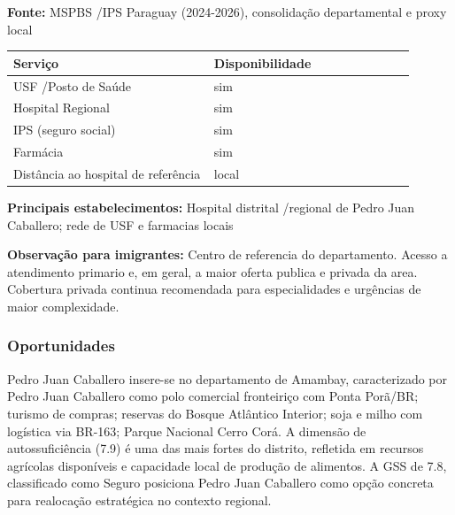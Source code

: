 \textbf{Fonte:} MSPBS /\allowbreak  IPS Paraguay (2024-2026), consolidação
departamental e proxy local

{\def\LTcaptype{none} %
\begin{longtable}{@{}>{\raggedright\arraybackslash}p{0.45\linewidth} >{\raggedright\arraybackslash}p{0.45\linewidth}@{}}
\toprule\noalign{}
Serviço & Disponibilidade \\
\midrule\noalign{}
\endhead
\bottomrule\noalign{}
\endlastfoot
USF /\allowbreak  Posto de Saúde & sim \\
Hospital Regional & sim \\
IPS (seguro social) & sim \\
Farmácia & sim \\
Distância ao hospital de referência & local \\
\end{longtable}
}

\textbf{Principais estabelecimentos:} Hospital distrital /\allowbreak  regional de
Pedro Juan Caballero; rede de USF e farmacias locais

\textbf{Observação para imigrantes:} Centro de referencia do
departamento. Acesso a atendimento primario e, em geral, a maior oferta
publica e privada da area. Cobertura privada continua recomendada para
especialidades e urgências de maior complexidade.
\newpage

\subsubsection*{Oportunidades}\label{oport-pedro-juan-caballero-1301}
Pedro Juan Caballero insere-se no departamento de Amambay, caracterizado por Pedro Juan Caballero como polo comercial fronteiriço com Ponta Porã/BR; turismo de compras; reservas do Bosque Atlântico Interior; soja e milho com logística via BR-163; Parque Nacional Cerro Corá. A dimensão de autossuficiência (7.9) é uma das mais fortes do distrito, refletida em recursos agrícolas disponíveis e capacidade local de produção de alimentos. A GSS de 7.8, classificado como Seguro posiciona Pedro Juan Caballero como opção concreta para realocação estratégica no contexto regional.

